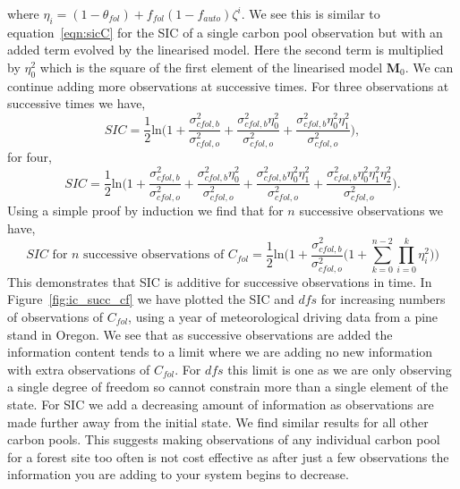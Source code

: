 \documentclass[11pt]{article}
\begin{document}
where $\eta_i=(1-\theta_{fol})+f_{fol}(1-f_{auto})\zeta^{i}$. We see this is similar to equation~\eqref{eqn:sicC} for the SIC of a single carbon pool observation but with an added term evolved by the linearised model. Here the second term is multiplied by \(\eta_{0}^2\) which is the square of the first element of the linearised model \(\mathbf{M}_0\). We can continue adding more observations at successive times. For three observations at successive times we have,
\begin{equation}
SIC =\frac{1}{2}\text{ln} \bigg(1+\frac{\sigma_{cfol,b}^{2}}{\sigma_{cfol,o}^{2}}+\frac{\sigma_{cfol,b}^{2}\eta_0^{2}}{\sigma_{cfol,o}^{2}}+\frac{\sigma_{cfol,b}^{2}\eta_0^{2}\eta_1^{2}}{\sigma_{cfol,o}^{2}} \bigg),
\end{equation}
for four,
\begin{equation}
SIC =\frac{1}{2}\text{ln} \bigg(1+\frac{\sigma_{cfol,b}^{2}}{\sigma_{cfol,o}^{2}}+\frac{\sigma_{cfol,b}^{2}\eta_0^{2}}{\sigma_{cfol,o}^{2}}+\frac{\sigma_{cfol,b}^{2}\eta_0^{2}\eta_1^{2}}{\sigma_{cfol,o}^{2}}+\frac{\sigma_{cfol,b}^{2}\eta_0^{2}\eta_1^{2}\eta_2^{2}}{\sigma_{cfol,o}^{2}} \bigg).
\end{equation}
Using a simple proof by induction we find that for \(n\) successive observations we have,
\begin{equation}
SIC\text{ for }n\text{ successive observations of }C_{fol} = \frac{1}{2}\text{ln}\bigg(1+\frac{\sigma_{cfol,b}^{2}}{\sigma_{cfol,o}^{2}}\big(1+\sum_{k=0}^{n-2}\prod_{i=0}^{k}\eta_i^{2}\big)\bigg)
\end{equation}
This demonstrates that SIC is additive for successive observations in time. In Figure~\ref{fig:ic_succ_cf} we have plotted the SIC and \(dfs\) for increasing numbers of observations of \(C_{fol}\), using a year of meteorological driving data from a pine stand in Oregon. We see that as successive observations are added the information content tends to a limit where we are adding no new information with extra observations of \(C_{fol}\). For \(dfs\) this limit is one as we are only observing a single degree of freedom so cannot constrain more than a single element of the state. For SIC we add a decreasing amount of information as observations are made further away from the initial state. We find similar results for all other carbon pools. This suggests making observations of any individual carbon pool for a forest site too often is not cost effective as after just a few observations the information you are adding to your system begins to decrease. 
\end{document}
